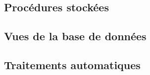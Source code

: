 \subsection{Procédures stockées}
\subsection{Vues de la base de données}
\subsection{Traitements automatiques}